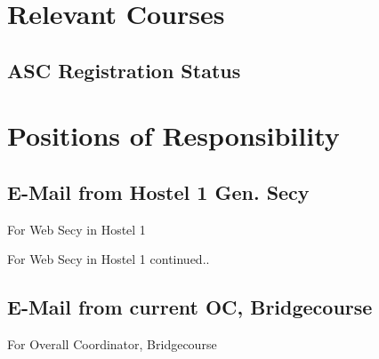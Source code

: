 \documentclass{article}
\begin{document}
\section{Relevant Courses}
	\subsection{ASC Registration Status}
	\begin{figure}[h]
		\end{figure}
\newpage
\section{Positions of Responsibility}
	\subsection{E-Mail from Hostel 1 Gen. Secy}
		For Web Secy in Hostel 1
		\begin{figure}[h]
		\end{figure}
\newpage
		\noindent For Web Secy in Hostel 1 continued..
		\begin{figure}[h]
		\end{figure}
\newpage
	\subsection{E-Mail from current OC, Bridgecourse}
		For Overall Coordinator, Bridgecourse
		\begin{figure}[h]
		\end{figure}
\newpage
\end{document}
